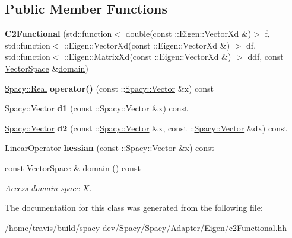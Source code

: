 \subsection*{Public Member Functions}
\begin{DoxyCompactItemize}
\item 
\hypertarget{classSpacy_1_1Rn_1_1C2Functional_a6d17f9e30a1c0fb522a0a135de96f72a}{{\bfseries C2\-Functional} (std\-::function$<$ double(const \-::Eigen\-::\-Vector\-Xd \&)$>$ f, std\-::function$<$ \-::Eigen\-::\-Vector\-Xd(const \-::Eigen\-::\-Vector\-Xd \&) $>$ df, std\-::function$<$ \-::Eigen\-::\-Matrix\-Xd(const \-::Eigen\-::\-Vector\-Xd \&) $>$ ddf, const \hyperlink{classSpacy_1_1VectorSpace}{Vector\-Space} \&\hyperlink{classSpacy_1_1FunctionalBase_a2d3397deb9fa1ad85ed04e37a03b3aa6}{domain})}\label{classSpacy_1_1Rn_1_1C2Functional_a6d17f9e30a1c0fb522a0a135de96f72a}

\item 
\hypertarget{classSpacy_1_1Rn_1_1C2Functional_ad69e7f55b9647b34f6e132e7c831c46f}{\hyperlink{classSpacy_1_1Real}{Spacy\-::\-Real} {\bfseries operator()} (const \-::\hyperlink{classSpacy_1_1Vector}{Spacy\-::\-Vector} \&x) const }\label{classSpacy_1_1Rn_1_1C2Functional_ad69e7f55b9647b34f6e132e7c831c46f}

\item 
\hypertarget{classSpacy_1_1Rn_1_1C2Functional_a5bfa18cf358557d1d1cc3d2a76022660}{\hyperlink{classSpacy_1_1Vector}{Spacy\-::\-Vector} {\bfseries d1} (const \-::\hyperlink{classSpacy_1_1Vector}{Spacy\-::\-Vector} \&x) const }\label{classSpacy_1_1Rn_1_1C2Functional_a5bfa18cf358557d1d1cc3d2a76022660}

\item 
\hypertarget{classSpacy_1_1Rn_1_1C2Functional_a4ebc4d850e0c11707a9d4c14f085e920}{\hyperlink{classSpacy_1_1Vector}{Spacy\-::\-Vector} {\bfseries d2} (const \-::\hyperlink{classSpacy_1_1Vector}{Spacy\-::\-Vector} \&x, const \-::\hyperlink{classSpacy_1_1Vector}{Spacy\-::\-Vector} \&dx) const }\label{classSpacy_1_1Rn_1_1C2Functional_a4ebc4d850e0c11707a9d4c14f085e920}

\item 
\hypertarget{classSpacy_1_1Rn_1_1C2Functional_a81b74f77f5680529d82cebde572643e4}{\hyperlink{classSpacy_1_1Rn_1_1LinearOperator}{Linear\-Operator} {\bfseries hessian} (const \-::\hyperlink{classSpacy_1_1Vector}{Spacy\-::\-Vector} \&x) const }\label{classSpacy_1_1Rn_1_1C2Functional_a81b74f77f5680529d82cebde572643e4}

\item 
\hypertarget{classSpacy_1_1FunctionalBase_a2d3397deb9fa1ad85ed04e37a03b3aa6}{const \hyperlink{classSpacy_1_1VectorSpace}{Vector\-Space} \& \hyperlink{classSpacy_1_1FunctionalBase_a2d3397deb9fa1ad85ed04e37a03b3aa6}{domain} () const }\label{classSpacy_1_1FunctionalBase_a2d3397deb9fa1ad85ed04e37a03b3aa6}

\begin{DoxyCompactList}\small\item\em Access domain space $X$. \end{DoxyCompactList}\end{DoxyCompactItemize}


The documentation for this class was generated from the following file\-:\begin{DoxyCompactItemize}
\item 
/home/travis/build/spacy-\/dev/\-Spacy/\-Spacy/\-Adapter/\-Eigen/c2\-Functional.\-hh\end{DoxyCompactItemize}
